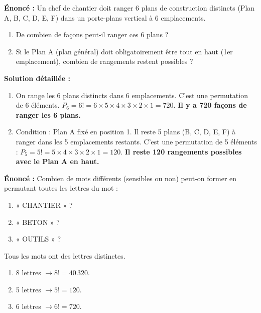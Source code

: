 \documentclass[11pt]{article}
\begin{document}
\begin{exoresolu}
\textbf{Énoncé :} Un chef de chantier doit ranger 6 plans de construction distincts (Plan A, B, C, D, E, F) dans un porte-plans vertical à 6 emplacements.
\begin{enumerate}
    \item De combien de façons peut-il ranger ces 6 plans ?
    \item Si le Plan A (plan général) doit obligatoirement être tout en haut (1er emplacement), combien de rangements restent possibles ?
\end{enumerate}
\tcblower
\textbf{Solution détaillée :}
\begin{enumerate}
    \item On range les 6 plans distincts dans 6 emplacements. C'est une permutation de 6 éléments.
    $P_6 = 6! = 6 \times 5 \times 4 \times 3 \times 2 \times 1 = 720$.
    \textbf{Il y a 720 façons de ranger les 6 plans.}
    \item Condition : Plan A fixé en position 1. Il reste 5 plans (B, C, D, E, F) à ranger dans les 5 emplacements restants.
    C'est une permutation de 5 éléments : $P_5 = 5! = 5 \times 4 \times 3 \times 2 \times 1 = 120$.
    \textbf{Il reste 120 rangements possibles avec le Plan A en haut.}
\end{enumerate}
\end{exoresolu}

\begin{exercice}
\textbf{Énoncé :} Combien de mots différents (sensibles ou non) peut-on former en permutant toutes les lettres du mot :
\begin{enumerate}
    \item « CHANTIER » ?
    \item « BETON » ?
    \item « OUTILS » ?
\end{enumerate}
\end{exercice}

\begin{corrige}
Tous les mots ont des lettres distinctes.
\begin{enumerate}
    \item 8 lettres $\rightarrow 8! = 40\,320$.
    \item 5 lettres $\rightarrow 5! = 120$.
    \item 6 lettres $\rightarrow 6! = 720$.
\end{enumerate}
\end{corrige}
\end{document}
